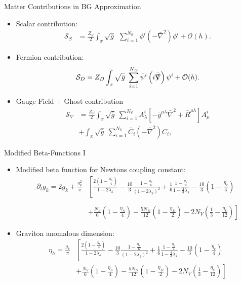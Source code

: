 \documentclass{beamer}
\begin{document}
\begin{frame}{Matter Contributions in BG Approximation}
	\begin{itemize}
		\item Scalar contribution:
		\begin{align}
	\mathcal{S}_S &=  \frac{Z_{S}}{2}\int_x \sqrt{\bar{g}} \ \ \sum\limits_{i=1}^{N_{\text{S}}} \phi^{i}\left(-\bar{\nabla}^2\right)\phi^{i} + \mathcal{O}(h). 
		\end{align}
		\item Fermion contribution:
		\begin{equation}
		\mathcal{S}_D =  Z_D\int_x \sqrt{\bar{g}} \ \sum\limits_{i=1}^{N_D}\bar{\psi}^{i}\left(i\bar{\slashed{\nabla}}\right)\psi^{i} + \mathcal{O}(h).
		\end{equation}
		\item Gauge Field + Ghost contribution	
		\begin{equation}
\begin{aligned}
\mathcal{S}_V &=  \frac{Z_{V}}{2} \int_x \sqrt{\bar{g}} \ \sum\limits_{i=1}^{N_{\text{V}}} A_{\lambda}^{i}\left[ - \bar{g}^{\mu\lambda}\bar{\nabla}^2 +  \bar{R}^{\mu\lambda}\right]A_{\mu}^{i} \\
&+\int_x \sqrt{\bar{g}} \ \sum\limits_{i=1}^{N_{\text{V}}} \bar{C}_i(-\bar{\nabla}^2)C_i,
\end{aligned}
\end{equation}
	\end{itemize}
\end{frame}
\begin{frame}{Modified Beta-Functions I}
\begin{itemize}
	\item Modified beta function for Newtons coupling constant:
	\small{
	\begin{align}
		\partial_tg_k = 2g_k +\frac{g_k^2}{\pi}&\left[\frac{2\left(1-\frac{\eta_h}{4}\right)}{1-2\lambda_k} -\frac{10}{3}\frac{1-{\frac{\eta_h}{6}}}{\left(1-2\lambda_k\right)^2}+\frac{1}{6}\frac{1-\frac{\eta_h}{4}}{1-\frac{4}{3}\lambda_k}-\frac{10}{3}\left(1-\frac{\eta_c}{4}\right)\right. \nonumber\\
		\phantom{.}\\
	 &\left. +\frac{N_S}{6}\left(1-\frac{\eta_S}{4}\right) - \frac{5N_D}{12}\left(1-\frac{\eta_D}{2}\right)-2N_V\left(\frac{1}{3}-\frac{\eta_V}{12}\right)\right]\nonumber
	\end{align}}
	\item Graviton anomalous dimension:
	\begin{equation}
\begin{aligned}
	\eta_h = \frac{g_k}{\pi}&\left[\frac{2\left(1-\frac{\eta_h}{4}\right)}{1-2\lambda_k} -\frac{10}{3}\frac{1-{\frac{\eta_h}{6}}}{\left(1-2\lambda_k\right)^2}+\frac{1}{6}\frac{1-\frac{\eta_h}{4}}{1-\frac{4}{3}\lambda_k}-\frac{10}{3}\left(1-\frac{\eta_c}{4}\right)\right.\\[10pt]
	 &\left. +\frac{N_S}{6}\left(1-\frac{\eta_S}{4}\right) - \frac{5N_D}{12}\left(1-\frac{\eta_D}{2}\right)-2N_V\left(\frac{1}{3}-\frac{\eta_V}{12}\right)\right]
\end{aligned}
\end{equation}
\end{itemize}	
\end{frame}
\end{document}
